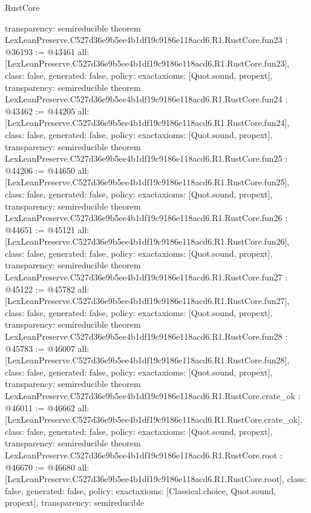 \begin{lexlean}{RustCore}
\begin{coremodule}
{  transparency: semireducible
}
theorem LexLeanPreserve.C527d36e9b5ee4b1df19c9186e118acd6.R1.RustCore.fun23 : @36193 := @43461 {
  all: [LexLeanPreserve.C527d36e9b5ee4b1df19c9186e118acd6.R1.RustCore.fun23],
  class: false,
  generated: false,
  policy: exact{axioms: [Quot.sound, propext]},
  transparency: semireducible
}
theorem LexLeanPreserve.C527d36e9b5ee4b1df19c9186e118acd6.R1.RustCore.fun24 : @43462 := @44205 {
  all: [LexLeanPreserve.C527d36e9b5ee4b1df19c9186e118acd6.R1.RustCore.fun24],
  class: false,
  generated: false,
  policy: exact{axioms: [Quot.sound, propext]},
  transparency: semireducible
}
theorem LexLeanPreserve.C527d36e9b5ee4b1df19c9186e118acd6.R1.RustCore.fun25 : @44206 := @44650 {
  all: [LexLeanPreserve.C527d36e9b5ee4b1df19c9186e118acd6.R1.RustCore.fun25],
  class: false,
  generated: false,
  policy: exact{axioms: [Quot.sound, propext]},
  transparency: semireducible
}
theorem LexLeanPreserve.C527d36e9b5ee4b1df19c9186e118acd6.R1.RustCore.fun26 : @44651 := @45121 {
  all: [LexLeanPreserve.C527d36e9b5ee4b1df19c9186e118acd6.R1.RustCore.fun26],
  class: false,
  generated: false,
  policy: exact{axioms: [Quot.sound, propext]},
  transparency: semireducible
}
theorem LexLeanPreserve.C527d36e9b5ee4b1df19c9186e118acd6.R1.RustCore.fun27 : @45122 := @45782 {
  all: [LexLeanPreserve.C527d36e9b5ee4b1df19c9186e118acd6.R1.RustCore.fun27],
  class: false,
  generated: false,
  policy: exact{axioms: [Quot.sound, propext]},
  transparency: semireducible
}
theorem LexLeanPreserve.C527d36e9b5ee4b1df19c9186e118acd6.R1.RustCore.fun28 : @45783 := @46007 {
  all: [LexLeanPreserve.C527d36e9b5ee4b1df19c9186e118acd6.R1.RustCore.fun28],
  class: false,
  generated: false,
  policy: exact{axioms: [Quot.sound, propext]},
  transparency: semireducible
}
theorem LexLeanPreserve.C527d36e9b5ee4b1df19c9186e118acd6.R1.RustCore.crate_ok : @46011 := @46662 {
  all: [LexLeanPreserve.C527d36e9b5ee4b1df19c9186e118acd6.R1.RustCore.crate_ok],
  class: false,
  generated: false,
  policy: exact{axioms: [Quot.sound, propext]},
  transparency: semireducible
}
theorem LexLeanPreserve.C527d36e9b5ee4b1df19c9186e118acd6.R1.RustCore.root : @46670 := @46680 {
  all: [LexLeanPreserve.C527d36e9b5ee4b1df19c9186e118acd6.R1.RustCore.root],
  class: false,
  generated: false,
  policy: exact{axioms: [Classical.choice, Quot.sound, propext]},
  transparency: semireducible
}


\end{coremodule}
\end{lexlean}
